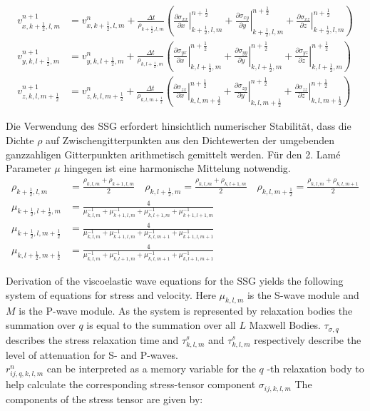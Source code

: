 \documentclass[pdftex,a4paper,parskip,listof=totoc,bibliography=totoc,onehalfspacing,12pt]{scrreprt}
\begin{document}
\begin{align*}
	v_{x,k+\frac{1}{2},l,m}^{n+1} &= v_{x,k+\frac{1}{2},l,m}^n + \frac{\Delta t}{\rho_{k+\frac{1}{2},l,m}}  \left( \left.\frac{\partial\sigma_{xx}}{\partial x}\right\rvert_{k+\frac{1}{2},l,m}^{n+\frac{1}{2}} + \left.\frac{\partial\sigma_{xy}}{\partial y}\right\rvert_{k+\frac{1}{2},l,m}^{n+\frac{1}{2}} + \left.\frac{\partial\sigma_{xz}}{\partial z}\right\rvert_{k+\frac{1}{2},l,m}^{n+\frac{1}{2}} \right)\\
	v_{y,k,l+\frac{1}{2},m}^{n+1} &= v_{y,k,l+\frac{1}{2},m}^n + \frac{\Delta t}{\rho_{k,l+\frac{1}{2},m}}  \left( \left.\frac{\partial\sigma_{yx}}{\partial x}\right\rvert_{k,l+\frac{1}{2},m}^{n+\frac{1}{2}} + \left.\frac{\partial\sigma_{yy}}{\partial y}\right\rvert_{k,l+\frac{1}{2},m}^{n+\frac{1}{2}} + \left.\frac{\partial\sigma_{yz}}{\partial z}\right\rvert_{k,l+\frac{1}{2},m}^{n+\frac{1}{2}} \right)\\
	v_{z,k,l,m+\frac{1}{2}}^{n+1} &= v_{z,k,l,m+\frac{1}{2}}^n + \frac{\Delta t}{\rho_{k,l,m+\frac{1}{2}}}  \left( \left.\frac{\partial\sigma_{zx}}{\partial x}\right\rvert_{k,l,m+\frac{1}{2}}^{n+\frac{1}{2}} + \left.\frac{\partial\sigma_{zy}}{\partial y}\right\rvert_{k,l,m+\frac{1}{2}}^{n+\frac{1}{2}} + \left.\frac{\partial\sigma_{zz}}{\partial z}\right\rvert_{k,l,m+\frac{1}{2}}^{n+\frac{1}{2}} \right)
\end{align*}


Die Verwendung des SSG erfordert hinsichtlich numerischer Stabilität, dass die Dichte $\rho$ auf Zwischengitterpunkten aus den Dichtewerten der umgebenden ganzzahligen Gitterpunkten arithmetisch gemittelt werden. Für den 2. Lamé Parameter $\mu$ hingegen ist eine harmonische Mittelung notwendig.
\begin{align*}
	\rho_{k+\frac{1}{2},l,m} &= \frac{\rho_{k,l,m} + \rho_{k+1,l,m}}{2} \quad \rho_{k,l+\frac{1}{2},m} = \frac{\rho_{k,l,m} + \rho_{k,l+1,m}}{2} \quad \rho_{k,l,m+\frac{1}{2}} = \frac{\rho_{k,l,m} + \rho_{k,l,m+1}}{2}\\
	\mu_{k+\frac{1}{2},l+\frac{1}{2},m} &= \frac{4}{\mu^{-1}_{k,l,m} + \mu^{-1}_{k+1,l,m} + \mu^{-1}_{k,l+1,m} + \mu^{-1}_{k+1,l+1,m}}\\
	\mu_{k+\frac{1}{2},l,m+\frac{1}{2}} &= \frac{4}{\mu^{-1}_{k,l,m} + \mu^{-1}_{k+1,l,m} + \mu^{-1}_{k,l,m+1} + \mu^{-1}_{k+1,l,m+1}}\\
	\mu_{k,l+\frac{1}{2},m+\frac{1}{2}} &= \frac{4}{\mu^{-1}_{k,l,m} + \mu^{-1}_{k,l+1,m} + \mu^{-1}_{k,l,m+1} + \mu^{-1}_{k,l+1,m+1}}
\end{align*}

Derivation of the viscoelastic wave equations for the SSG yields the following system of equations for stress and velocity. Here $\mu_{k,l,m}$ is the S-wave module and $M$ is the P-wave module. As the system is represented by relaxation bodies the summation over $q$ is equal to the summation over all $L$ Maxwell Bodies. $\tau_{\sigma,q}$ describes the stress relaxation time and $\tau_{k,l,m}^s$ and $\tau_{k,l,m}^s$ respectively describe the level of attenuation for S- and P-waves. \\$r_{ij,q,k,l,m}^{n}$ can be interpreted as a memory variable for the $q$ -th relaxation body to help calculate the corresponding stress-tensor component $\sigma_{ij,k,l,m}$
The components of the stress tensor are given by:
\end{document}
